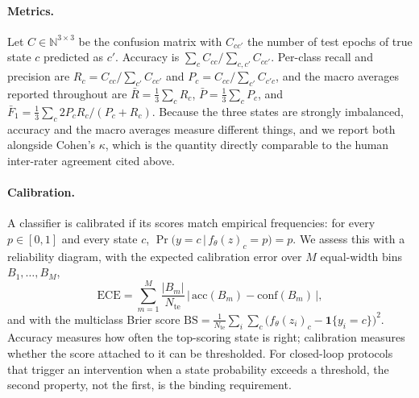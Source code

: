\paragraph{Metrics.}
Let $C \in \mathbb{N}^{3\times 3}$ be the confusion matrix with $C_{cc'}$ the number of test epochs of true state $c$ predicted as $c'$. Accuracy is $\sum_c C_{cc} / \sum_{c,c'} C_{cc'}$. Per-class recall and precision are $R_c = C_{cc}/\sum_{c'} C_{cc'}$ and $P_c = C_{cc}/\sum_{c'} C_{c'c}$, and the macro averages reported throughout are $\bar{R} = \tfrac{1}{3}\sum_c R_c$, $\bar{P} = \tfrac{1}{3}\sum_c P_c$, and $\bar{F}_1 = \tfrac{1}{3}\sum_c 2P_cR_c/(P_c+R_c)$. Because the three states are strongly imbalanced, accuracy and the macro averages measure different things, and we report both alongside Cohen's $\kappa$, which is the quantity directly comparable to the human inter-rater agreement cited above.

\paragraph{Calibration.}
A classifier is calibrated if its scores match empirical frequencies: for every $p \in [0,1]$ and every state $c$, $\Pr\big(y = c \,\big|\, f_\theta(z)_c = p\big) = p$. We assess this with a reliability diagram, with the expected calibration error over $M$ equal-width bins $B_1,\dots,B_M$,
\begin{equation}
\mathrm{ECE} = \sum_{m=1}^{M} \frac{|B_m|}{N_{\mathrm{te}}}\,\big|\,\mathrm{acc}(B_m) - \mathrm{conf}(B_m)\,\big|,
\label{eq:ece}
\end{equation}
and with the multiclass Brier score $\mathrm{BS} = \tfrac{1}{N_{\mathrm{te}}}\sum_i \sum_{c} \big(f_\theta(z_i)_c - \mathbf{1}\{y_i = c\}\big)^2$. Accuracy measures how often the top-scoring state is right; calibration measures whether the score attached to it can be thresholded. For closed-loop protocols that trigger an intervention when a state probability exceeds a threshold, the second property, not the first, is the binding requirement.


